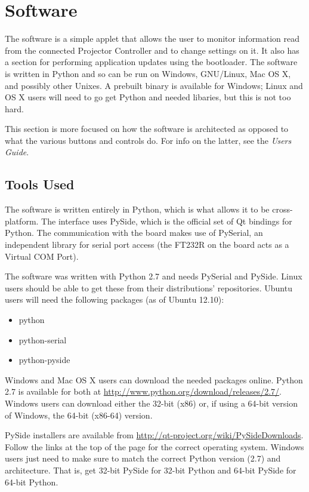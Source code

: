 \documentclass{article}
\begin{document}
\section{Software} \label{sec:Software}
The software is a simple applet that allows the user to monitor information read from the connected
Projector Controller and to change settings on it.  It also has a section for performing application
updates using the bootloader.  The software is written in Python and so can be run on Windows,
GNU/Linux, Mac OS X, and possibly other Unixes.  A prebuilt binary is available for Windows; Linux
and OS X users will need to go get Python and needed libaries, but this is not too hard.

This section is more focused on how the software is architected as opposed to what the various
buttons and controls do.  For info on the latter, see the \emph{Users Guide}.

\subsection{Tools Used} \label{ssec:SWTools} 
The software is written entirely in Python, which is what allows it to be cross-platform.  The
interface uses PySide, which is the official set of Qt bindings for Python.  The communication with
the board makes use of PySerial, an independent library for serial port access (the FT232R on the
board acts as a Virtual COM Port).

The software was written with Python 2.7 and needs PySerial and PySide.  Linux users should be able
to get these from their distributions' repositories.  Ubuntu users will need the following packages
(as of Ubuntu 12.10):

\begin{itemize}
  \item python
  \item python-serial
  \item python-pyside
\end{itemize}

Windows and Mac OS X users can download the needed packages online.  Python 2.7 is available for
both at \url{http://www.python.org/download/releases/2.7/}.  Windows users can download either the
32-bit (x86) or, if using a 64-bit version of Windows, the 64-bit (x86-64) version.

PySide installers are available from \url{http://qt-project.org/wiki/PySideDownloads}.  Follow the
links at the top of the page for the correct operating system.  Windows users just need to make sure
to match the correct Python version (2.7) and architecture.  That is, get 32-bit PySide for 32-bit
Python and 64-bit PySide for 64-bit Python.
\end{document}
